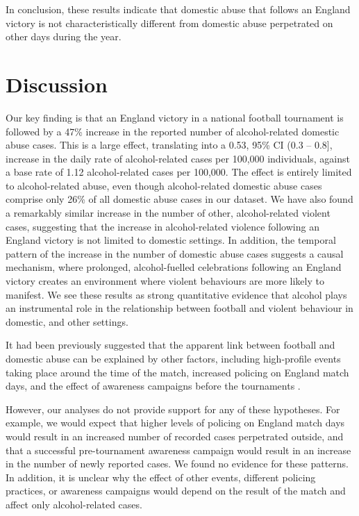 \documentclass[12pt, a4paper]{article}
\begin{document}
In conclusion, these results indicate that domestic abuse that follows an England victory is not characteristically different from domestic abuse perpetrated on other days during the year.

\clearpage

\section*{Discussion}

Our key finding is that an England victory in a national football tournament is followed by a 47\% increase in the reported number of alcohol-related domestic abuse cases. This is a large
effect, translating into a 0.53, 95\% CI (0.3 -- 0.8], increase in the daily rate of alcohol-related cases per 100,000 individuals, against a base rate of 1.12 alcohol-related cases per 100,000. The effect is entirely limited to alcohol-related abuse, even though alcohol-related domestic abuse cases comprise only 26\% of all domestic abuse cases in our dataset. We have also found a remarkably similar increase in the number of other, alcohol-related violent cases, suggesting that the increase in alcohol-related violence following an England victory is not limited to domestic settings. In addition, the temporal pattern of the increase in the number of domestic abuse cases suggests a causal mechanism, where prolonged, alcohol-fuelled celebrations following an England victory creates an environment where violent behaviours are more likely to manifest. We see these results as strong quantitative evidence that alcohol plays an instrumental role in the relationship between football and violent behaviour in domestic, and other settings. 



It had been previously suggested that the apparent link between football and domestic abuse can be explained by other factors, including high-profile events taking place around the time of the match, increased policing on England match days, and the effect of awareness campaigns before the tournaments \cite{Brooks-Hay2018}. 

However, our analyses do not provide support for any of these hypotheses. For example, we would expect that higher levels of policing on England match days would result in an increased number of recorded cases perpetrated outside, and that a successful pre-tournament awareness campaign would result in an increase in the number of newly reported cases. We found no evidence for these patterns. In addition, it is unclear why the effect of other events, different policing practices, or awareness campaigns would depend on the result of the match and affect only alcohol-related cases. 
\end{document}
